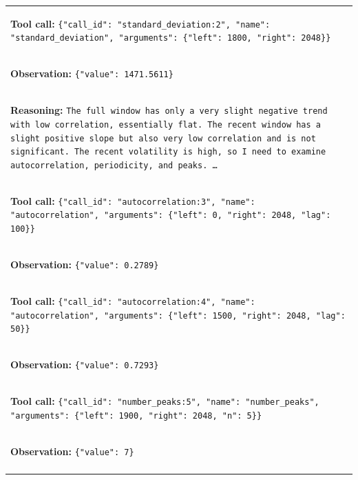 \documentclass[11pt]{article}
\begin{document}
\begin{table}[t]
\begin{tabular}{p{}}
\hdashline

\colorbox{red!10}{\parbox{0.95\textwidth}{%
\textbf{Tool call:}
\texttt{\{"call\_id": "standard\_deviation:2", "name":
"standard\_deviation", "arguments": \{"left": 1800, "right": 2048\}\}}
}} \\

\colorbox{blue!10}{\parbox{0.95\textwidth}{%
\textbf{Observation:}
\texttt{\{"value": 1471.5611\}}
}} \\

\hdashline

\colorbox{green!10}{\parbox{0.95\textwidth}{%
\textbf{Reasoning:}
\texttt{The full window has only a very slight negative trend with low
correlation, essentially flat. The recent window has a slight positive slope
but also very low correlation and is not significant. The recent volatility is
high, so I need to examine autocorrelation, periodicity, and peaks. \ldots}
}} \\

\hdashline

\colorbox{red!10}{\parbox{0.95\textwidth}{%
\textbf{Tool call:}
\texttt{\{"call\_id": "autocorrelation:3", "name": "autocorrelation",
"arguments": \{"left": 0, "right": 2048, "lag": 100\}\}}
}} \\

\colorbox{blue!10}{\parbox{0.95\textwidth}{%
\textbf{Observation:}
\texttt{\{"value": 0.2789\}}
}} \\

\hdashline

\colorbox{red!10}{\parbox{0.95\textwidth}{%
\textbf{Tool call:}
\texttt{\{"call\_id": "autocorrelation:4", "name": "autocorrelation",
"arguments": \{"left": 1500, "right": 2048, "lag": 50\}\}}
}} \\

\colorbox{blue!10}{\parbox{0.95\textwidth}{%
\textbf{Observation:}
\texttt{\{"value": 0.7293\}}
}} \\

\hdashline

\colorbox{red!10}{\parbox{0.95\textwidth}{%
\textbf{Tool call:}
\texttt{\{"call\_id": "number\_peaks:5", "name": "number\_peaks",
"arguments": \{"left": 1900, "right": 2048, "n": 5\}\}}
}} \\

\colorbox{blue!10}{\parbox{0.95\textwidth}{%
\textbf{Observation:}
\texttt{\{"value": 7\}}
}} \\

\hdashline


\end{tabular}
\end{table}
\end{document}
